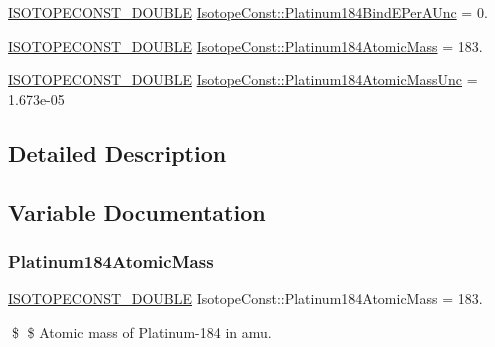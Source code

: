 \begin{DoxyCompactItemize}
\mbox{\hyperlink{group___isotope_const-_macros_ga8f45a7272ce02c0b4c65c44636ed719a}{I\+S\+O\+T\+O\+P\+E\+C\+O\+N\+S\+T\+\_\+\+D\+O\+U\+B\+LE}} \mbox{\hyperlink{group___isotope_const-_platinum-_pt184_gab2f91f468b69b31039a20670f71776f2}{Isotope\+Const\+::\+Platinum184\+Bind\+E\+Per\+A\+Unc}} = 0.
\item 
\mbox{\hyperlink{group___isotope_const-_macros_ga8f45a7272ce02c0b4c65c44636ed719a}{I\+S\+O\+T\+O\+P\+E\+C\+O\+N\+S\+T\+\_\+\+D\+O\+U\+B\+LE}} \mbox{\hyperlink{group___isotope_const-_platinum-_pt184_gae13e2fb026a6f1ad6417f5f34cecdb32}{Isotope\+Const\+::\+Platinum184\+Atomic\+Mass}} = 183.
\item 
\mbox{\hyperlink{group___isotope_const-_macros_ga8f45a7272ce02c0b4c65c44636ed719a}{I\+S\+O\+T\+O\+P\+E\+C\+O\+N\+S\+T\+\_\+\+D\+O\+U\+B\+LE}} \mbox{\hyperlink{group___isotope_const-_platinum-_pt184_ga96b11243e330f396ea2dede9900f2fc7}{Isotope\+Const\+::\+Platinum184\+Atomic\+Mass\+Unc}} = 1.\+673e-\/05
\end{DoxyCompactItemize}


\subsection{Detailed Description}


\subsection{Variable Documentation}
\mbox{\label{group___isotope_const-_platinum-_pt184_gae13e2fb026a6f1ad6417f5f34cecdb32}} 
\subsubsection{\texorpdfstring{Platinum184\+Atomic\+Mass}{Platinum184AtomicMass}}
{\footnotesize\ttfamily \mbox{\hyperlink{group___isotope_const-_macros_ga8f45a7272ce02c0b4c65c44636ed719a}{I\+S\+O\+T\+O\+P\+E\+C\+O\+N\+S\+T\+\_\+\+D\+O\+U\+B\+LE}} Isotope\+Const\+::\+Platinum184\+Atomic\+Mass = 183.}

\$ \$ Atomic mass of Platinum-\/184 in amu. \mbox{\label{group___isotope_const-_platinum-_pt184_ga96b11243e330f396ea2dede9900f2fc7}} 
